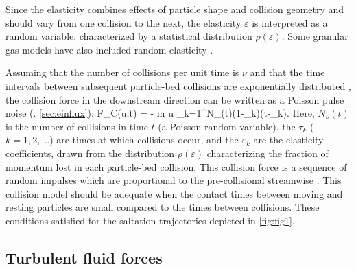 Since the elasticity combines effects of particle shape and collision geometry and should vary from one collision to the next, the elasticity $\varepsilon$ is interpreted as a random variable, characterized by a statistical distribution $\rho(\varepsilon)$.
Some granular gas models have also included random elasticity \citep[e.g.][]{Serero2015}\DIFaddbegin {}\DIFaddend .

Assuming that the number of collisions per unit time is $\nu$ and that the time intervals between subsequent particle-bed collisions are exponentially distributed \DIFdelbegin {}\DIFdelend \DIFaddbegin {}\DIFaddend , the collision force in the downstream direction can be written as a Poisson pulse noise (\DIFdelbegin {}\DIFdelend \DIFaddbegin {}\DIFaddend . \ref{sec:einflux}):
\be F_C(u,t) = - m u \sum_{k=1}^{N_\nu(t)}(1-\varepsilon_k)\delta(t-\tau_k). \label{eq:col} \ee
Here, $N_\nu(t)$ is the number of collisions in time $t$ (a Poisson random variable), the $\tau_k$ ($k=1,2,\dots$) are times at which collisions occur, and the $\varepsilon_k$ are the elasticity coefficients, drawn from the distribution $\rho(\varepsilon)$ characterizing the fraction of momentum lost in each particle-bed collision.
\DIFaddbegin {}\DIFaddend This collision force is a sequence of random impulses which are proportional to the pre-collisional streamwise \DIFdelbegin {}\DIFdelend \DIFaddbegin {}\DIFaddend . This collision model should be adequate when the contact times between moving and resting particles are small compared to the times between collisions. These conditions \DIFdelbegin {}\DIFdelend \DIFaddbegin {}\DIFaddend satisfied for the \DIFdelbegin {}\DIFdelend saltation trajectories depicted in \DIFdelbegin {}\DIFdelend \DIFaddbegin {}\DIFaddend \ref{fig:fig1}.

\subsection{Turbulent fluid forces}
\DIFaddbegin 

